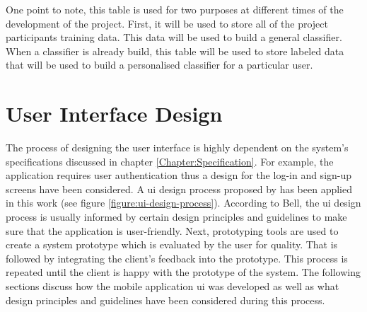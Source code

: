         One point to note, this table is used for two purposes at different times of the development of the project. First, it will be used to store all of the project participants training data. This data will be used to build a general classifier. When a classifier is already build, this table will be used to store labeled data that will be used to build a personalised classifier for a particular user.
    
    
        
    \section{User Interface Design}
    \label{section:user_interface_design}
    The process of designing the user interface is highly dependent on the system's specifications discussed in chapter \ref{Chapter:Specification}. For example, the application requires user authentication thus a design for the log-in and sign-up screens have been considered. A \gls{ui} design process proposed by \citet[60]{bell2005} has been applied in this work (see figure \ref{figure:ui-design-process}). According to Bell, the \gls{ui} design process is usually informed by certain design principles and guidelines to make sure that the application is user-friendly. Next, prototyping tools are used to create a system prototype which is evaluated by the user for quality. That is followed by integrating the client's feedback into the prototype. This process is repeated until the client is happy with the prototype of the system. The following sections discuss how the mobile application \gls{ui} was developed as well as what design principles and guidelines have been considered during this process.
    
